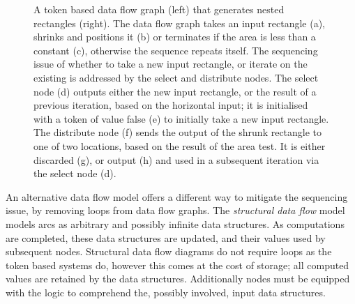 \begin{figure}
\centering
\def\svgwidth{1.\columnwidth}

\caption[A token based data flow graph]{A token based data flow graph (left) that generates nested rectangles (right). The data flow graph takes an input rectangle (a), shrinks and positions it (b) or terminates if the area is less than a constant (c), otherwise the sequence repeats itself. The sequencing issue of whether to take a new input rectangle, or iterate on the existing is addressed by the select and distribute nodes. The select node (d) outputs either the new input rectangle, or the result of a previous iteration, based on the horizontal input; it is initialised with a token of value false (e) to initially take a new input rectangle. The distribute node (f) sends the output of the shrunk rectangle to one of two locations, based on the result of the area test. It is either discarded (g), or output (h) and used in a subsequent iteration via the select node (d).}
\label{fig:myDataFlow}
\end{figure}

An alternative data flow model offers a different way to mitigate the sequencing issue, by removing loops from data flow graphs. The \emph{structural data flow} model\cite{Davis82} models arcs as arbitrary and possibly infinite data structures. As computations are completed, these data structures are updated, and their values used by subsequent nodes. Structural data flow diagrams do not require loops as the token based systems do, however this comes at the cost of storage; all computed values are retained by the data structures. Additionally nodes must be equipped with the logic to comprehend the, possibly involved, input data structures. 






